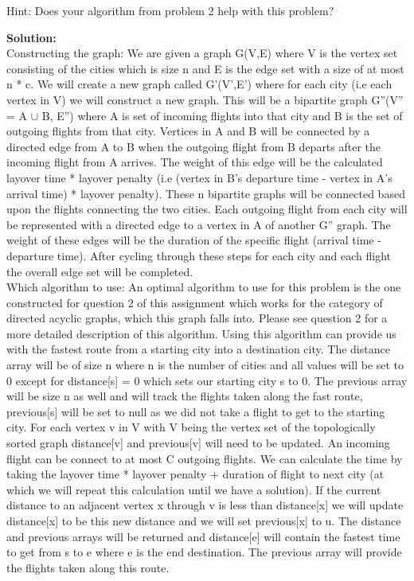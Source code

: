 \documentclass[12pt]{article}
\begin{document}
Hint: Does your algorithm from problem 2 help with this problem?

\textbf{Solution:}\\
Constructing the graph: We are given a graph G(V,E) where V is the vertex set consisting of the cities which is size n and E is the edge set with a size of at most n * c. We will create a new graph called G'(V',E') where for each city (i.e each vertex in V) we will construct a new graph. This will be a bipartite graph G''(V'' = A $\cup$ B, E'') where A is set of incoming flights into that city and B is the set of outgoing flights from that city. Vertices in A and B will be connected by a directed edge from A to B when the outgoing flight from B departs after the incoming flight from A arrives. The weight of this edge will be the calculated layover time * layover penalty (i.e (vertex in B's departure time - vertex in A's arrival time) * layover penalty). These n bipartite graphs will be connected based upon the flights connecting the two cities.  Each outgoing flight from each city will be represented with a directed edge to a vertex in A of another G'' graph. The weight of these edges will be the duration of the specific flight (arrival time - departure time). After cycling through these steps for each city and each flight the overall edge set will be completed.\\

Which algorithm to use: An optimal algorithm to use for this problem is the one constructed for question 2 of this assignment which works for the category of directed acyclic graphs, which this graph falls into. Please see question 2 for a more detailed description of this algorithm. Using this algorithm can provide us with the fastest route from a starting city into a destination city. The distance array will be of size n where n is the number of cities and all values will be set to 0 except for distance[s] = 0 which sets our starting city s to 0. The previous array will be size n as well and will track the flights taken along the fast route, previous[s] will be set to null as we did not take a flight to get to the starting city. For each vertex v in V with V being the vertex set of the topologically sorted graph distance[v] and previous[v] will need to be updated. An incoming flight can be connect to at most C outgoing flights. We can calculate the time by taking the layover time * layover penalty + duration of flight to next city (at which we will repeat this calculation until we have a solution). If the current distance to an adjacent vertex x through v is less than distance[x] we will update distance[x] to be this new distance and we will set previous[x] to u. The distance and previous arrays will be returned and distance[e] will contain the fastest time to get from s to e where e is the end destination. The previous array will provide the flights taken along this route.\\
\end{document}
